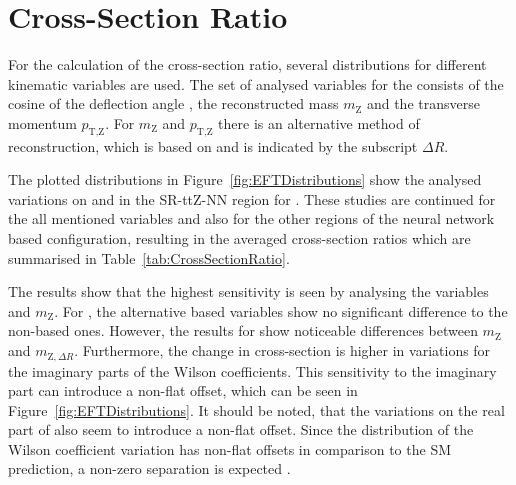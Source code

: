 \documentclass[bachelor,oneside, BCOR10mm,
			ngerman,english  %
]{GAUBM}
\begin{document}
\section{Cross-Section Ratio}
\label{sec:CrossSectionRatio}
For the calculation of the cross-section ratio, several distributions for different kinematic variables are used. The set of analysed variables for the \zboson consists of the cosine of the deflection angle \cosstar, the reconstructed mass $m_\text{Z}$ and the transverse momentum $p_{\text{T},\text{Z}}$. For $m_\text{Z}$ and $p_{\text{T},\text{Z}}$ there is an alternative method of reconstruction, which is based on \dR and is indicated by the subscript $\Delta R$. 

The plotted distributions in Figure~\ref{fig:EFTDistributions} show the analysed variations on \ctB and \ctW in the SR-ttZ-NN region for \cosstar. These studies are continued for the all mentioned variables and also for the other regions of the neural network based configuration, resulting in the averaged cross-section ratios which are summarised in Table~\ref{tab:CrossSectionRatio}.

The results show that the highest sensitivity is seen by analysing the variables \cosstar and $m_\text{Z}$. For \ctB, the alternative \dR based variables  show no significant difference to the non-\dR based ones. However, the results for \ctW show noticeable differences between $m_\text{Z}$ and $m_{\text{Z},\Delta R}$. Furthermore, the change in cross-section is higher in variations for the imaginary parts of the Wilson coefficients. This sensitivity to the imaginary part can introduce a non-flat offset, which can be seen in Figure~\ref{fig:EFTDistributions}. It should be noted, that the variations on the real part of \ctW also seem to introduce a non-flat offset.  Since the distribution of the Wilson coefficient variation has non-flat offsets in comparison to the SM prediction, a non-zero separation is expected \cite{shape}.
\end{document}

